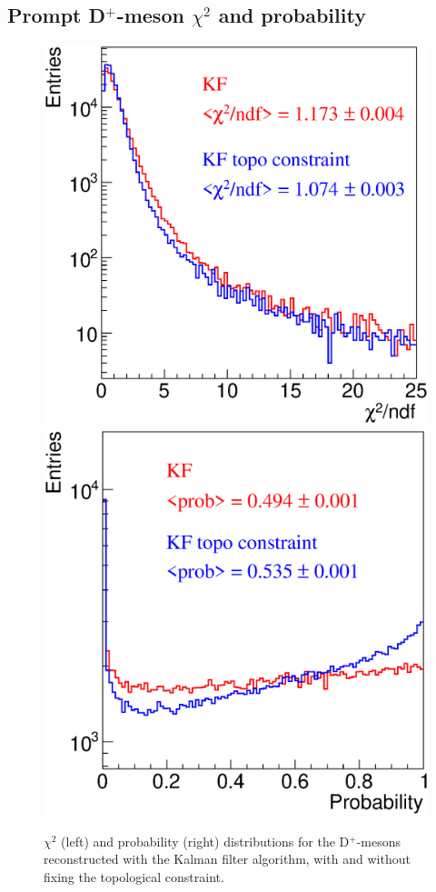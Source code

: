 \documentclass[b5paper,10pt,twoside,oldstyle,classica]{toptesi}
\begin{document}
\subsection{Prompt D$^+$-meson $\chi^2$ and probability}
\begin{figure}[tb]
\begin{center}
{\includegraphics[scale = 0.28]{ChiSquare.eps}}
\hspace{0.cm}
{\includegraphics[scale = 0.28]{Probability.eps}}
\caption{$\chi^2$ (left) and probability (right) distributions for the D$^+$-mesons reconstructed with the Kalman filter algorithm, with and without fixing the topological constraint.}
\label{KF_chiprob}
\end{center}
\end{figure} 
\end{document}

